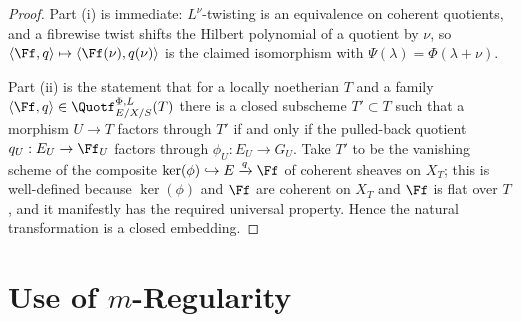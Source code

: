 \begin{proof}
  Part (i) is immediate: $L^\nu$-twisting is an equivalence on coherent
  quotients, and a fibrewise twist shifts the Hilbert polynomial of a quotient
  by $\nu$, so $\langle \Ff, q\rangle \mapsto \langle \Ff(\nu), q(\nu)\rangle$
  is the claimed isomorphism with $\Psi(\lambda) = \Phi(\lambda + \nu)$.

  Part (ii) is the statement that for a locally noetherian $T$ and a family
  $\langle \Ff, q\rangle \in \Quotf_{E/X/S}^{\Phi,L}(T)$ there is a closed
  subscheme $T' \subset T$ such that a morphism $U \to T$ factors through $T'$
  if and only if the pulled-back quotient $q_U : E_U \to \Ff_U$ factors through
  $\phi_U : E_U \to G_U$. Take $T'$ to be the vanishing scheme of the composite
  $\ker(\phi) \hookrightarrow E \xrightarrow{q} \Ff$ of coherent sheaves on
  $X_T$; this is well-defined because $\ker(\phi)$ and $\Ff$ are coherent on
  $X_T$ and $\Ff$ is flat over $T$, and it manifestly has the required universal
  property. Hence the natural transformation is a closed embedding.
\end{proof}

\bigskip
\section*{Use of $m$-Regularity}
\medskip

